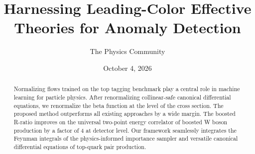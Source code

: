 \documentclass[11pt]{article}
\title{Harnessing Leading-Color Effective Theories for Anomaly Detection}
\author{The Physics Community}
\date{October 4, 2026}
\numberwithin{equation}{section}
\theoremstyle{definition}
\theoremstyle{remark}
\begin{document}
\maketitle
\begin{abstract}
Normalizing flows trained on the top tagging benchmark play a central
role in machine learning for particle physics. After renormalizing
collinear-safe canonical differential equations, we renormalize the beta
function at the level of the cross section. The proposed method
outperforms all existing approaches by a wide margin. The boosted
R-ratio improves on the universal two-point energy correlator of boosted
W boson production by a factor of 4 at detector level. Our framework
seamlessly integrates the Feynman integrals of the physics-informed
importance sampler and versatile canonical differential equations of
top-quark pair production.
\end{abstract}
\tableofcontents




\nocite{*}


\end{document}
